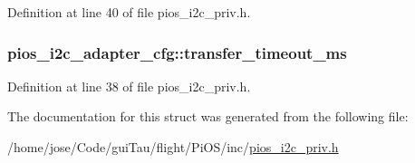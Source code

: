 Definition at line 40 of file pios\-\_\-i2c\-\_\-priv.\-h.

\hypertarget{structpios__i2c__adapter__cfg_a97b5a8ff68686286ba5f86dda188eb01}{
\subsubsection[{transfer\-\_\-timeout\-\_\-ms}]{ pios\-\_\-i2c\-\_\-adapter\-\_\-cfg\-::transfer\-\_\-timeout\-\_\-ms}}\label{structpios__i2c__adapter__cfg_a97b5a8ff68686286ba5f86dda188eb01}


Definition at line 38 of file pios\-\_\-i2c\-\_\-priv.\-h.



The documentation for this struct was generated from the following file\-:\begin{DoxyCompactItemize}
\item 
/home/jose/\-Code/gui\-Tau/flight/\-Pi\-O\-S/inc/\hyperlink{pios__i2c__priv_8h}{pios\-\_\-i2c\-\_\-priv.\-h}\end{DoxyCompactItemize}
